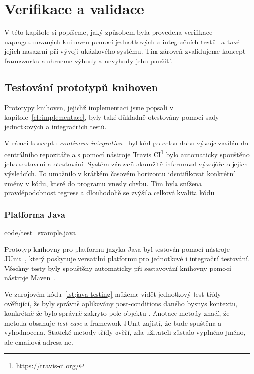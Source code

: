 

\chapter{Verifikace a validace}\label{ch:verifikace}

V této kapitole si popíšeme, jaký způsobem byla provedena
verifikace naprogramovaných knihoven pomocí
jednotkových a integračních testů~\cite{luo2001software}
a také jejich nasazení při vývoji ukázkového systému.
Tím zároveň zvalidujeme koncept frameworku a shrneme výhody
a nevýhody jeho použití.

\section{Testování prototypů knihoven}

Prototypy knihoven, jejichž implementaci jsme popsali
v kapitole~\ref{ch:implementace}, byly také důkladně
otestovány pomocí sady jednotkových a integračních testů.

V rámci konceptu \textit{continous integration}~\cite{fowler2006continuous}
byl kód po celou dobu vývoje zasílán do centrálního repozitáře
a s pomocí nástroje Travis CI\footnote{https://travis-ci.org/}
bylo automaticky spouštěno jeho sestavení a otestování. Systém
zároveň okamžitě informoval vývojáře o jejich výsledcích. To
umožnilo v krátkém časovém horizontu identifikovat konkrétní změny
v kódu, které do programu vnesly chybu. Tím byla snížena
pravděpodobnost regrese a dlouhodobě se zvýšila celková kvalita kódu.

\subsection{Platforma Java}


{code/test_example.java}

Prototyp knihovny pro platformu jazyka Java byl testován pomocí
nástroje JUnit~\cite{junit4}, který poskytuje versatilní platformu pro
jednotkové i integrační testování. Všechny testy byly spouštěny automaticky
při sestavování knihovny pomocí nástroje Maven~\cite{maven}.

Ve zdrojovém kódu~\ref{lst:java-testing}
můžeme vidět jednotkový test třídy  ověřující,
že byly správně aplikovány post-conditions daného byznys kontextu, konkrétně
že bylo správně zakryto pole  objektu . Anotace
 metody  značí,
že metoda obsahuje \textit{test case} a framework JUnit zajistí, že bude spuštěna
a vyhodnocena. Statické metody třídy  ověří, zda uživateli zůstalo
vyplněno jméno, ale emailová adresa ne.


